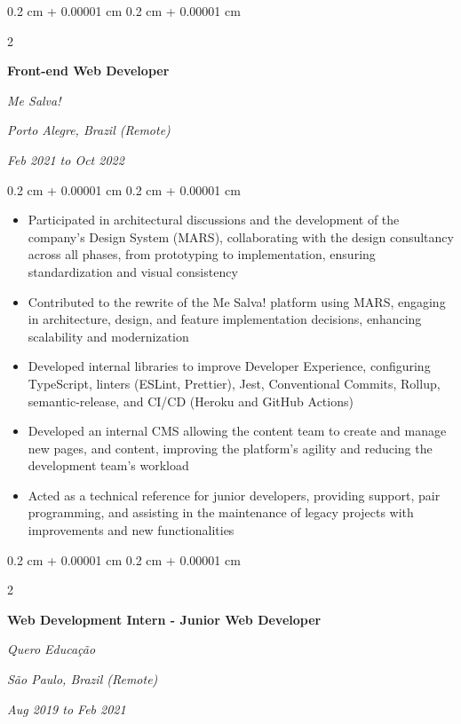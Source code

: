 \documentclass[10pt, a4paper]{article}
\newenvironment{highlights}{
    \begin{itemize}[
        topsep=0.10 cm,
        parsep=0.10 cm,
        partopsep=0pt,
        itemsep=0pt,
        leftmargin=0.4 cm + 10pt
    ]
}{
    \end{itemize}
} %
\newenvironment{onecolentry}{
    \begin{adjustwidth}{
        0.2 cm + 0.00001 cm
    }{
        0.2 cm + 0.00001 cm
    }
}{
    \end{adjustwidth}
} %
\newenvironment{twocolentry}[2][]{
    \onecolentry
    \def\secondColumn{#2}
    \setcolumnwidth{\fill, 7 cm}
    \begin{paracol}{2}
}{
    \switchcolumn \raggedleft \secondColumn
    \end{paracol}
    \endonecolentry
} %
\begin{document}
        \vspace{0.2 cm}

        \begin{twocolentry}{
        \textit{Porto Alegre, Brazil (Remote)}    
            
        \textit{Feb 2021 to Oct 2022}}
            \textbf{Front-end Web Developer}
            
            \textit{Me Salva!}
        \end{twocolentry}

        \vspace{0.10 cm}
        \begin{onecolentry}
            \begin{highlights}
                \item Participated in architectural discussions and the development of the company's Design System (MARS), collaborating with the design consultancy across all phases, from prototyping to implementation, ensuring standardization and visual consistency
                \item Contributed to the rewrite of the Me Salva! platform using MARS, engaging in architecture, design, and feature implementation decisions, enhancing scalability and modernization
                \item Developed internal libraries to improve Developer Experience, configuring TypeScript, linters (ESLint, Prettier), Jest, Conventional Commits, Rollup, semantic-release, and CI/CD (Heroku and GitHub Actions)
                \item Developed an internal CMS allowing the content team to create and manage new pages, and content, improving the platform's agility and reducing the development team's workload
                \item Acted as a technical reference for junior developers, providing support, pair programming, and assisting in the maintenance of legacy projects with improvements and new functionalities
            \end{highlights}
        \end{onecolentry}


        \vspace{0.2 cm}

        \begin{twocolentry}{
        \textit{São Paulo, Brazil (Remote)}    
            
        \textit{Aug 2019 to Feb 2021}}
            \textbf{Web Development Intern - Junior Web Developer}
            
            \textit{Quero Educação}
        \end{twocolentry}
\end{document}
